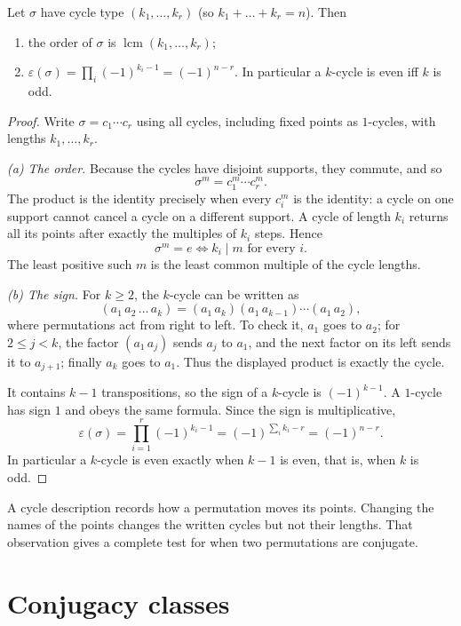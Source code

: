 \begin{corollary}\label{cor:ordersign}
Let $\sigma$ have cycle type $(k_1,\dots,k_r)$ (so $k_1+\dots+k_r=n$). Then
\begin{enumerate}[label=(\alph*)]
\item the order of $\sigma$ is $\operatorname{lcm}(k_1,\dots,k_r)$;
\item $\varepsilon(\sigma)=\prod_i(-1)^{k_i-1}=(-1)^{n-r}$. In particular a $k$-cycle is even iff $k$ is odd.
\end{enumerate}
\end{corollary}
\begin{proof}
Write $\sigma=c_1\cdots c_r$ using all cycles,
including fixed points as $1$-cycles, with
lengths $k_1,\ldots,k_r$.

\emph{(a) The order.}
Because the cycles have disjoint supports, they commute,
and so
\[
\sigma^m=c_1^m\cdots c_r^m.
\]
The product is the identity precisely when every
$c_i^m$ is the identity: a cycle on one support cannot
cancel a cycle on a different support.
A cycle of length $k_i$ returns all its points after
exactly the multiples of $k_i$ steps. Hence
\[
\sigma^m=e
\iff k_i\mid m\text{ for every }i.
\]
The least positive such $m$ is the least common multiple
of the cycle lengths.

\emph{(b) The sign.}
For $k\ge2$, the $k$-cycle can be written as
\[
(a_1\,a_2\,\ldots\,a_k)
=(a_1\,a_k)(a_1\,a_{k-1})\cdots(a_1\,a_2),
\]
where permutations act from right to left.
To check it, $a_1$ goes to $a_2$; for
$2\le j<k$, the factor $(a_1\,a_j)$ sends
$a_j$ to $a_1$, and the next factor on its left
sends it to $a_{j+1}$; finally $a_k$ goes to $a_1$.
Thus the displayed product is exactly the cycle.

It contains $k-1$ transpositions, so the sign
of a $k$-cycle is $(-1)^{k-1}$.
A $1$-cycle has sign $1$ and obeys the same formula.
Since the sign is multiplicative,
\[
\varepsilon(\sigma)
=\prod_{i=1}^r(-1)^{k_i-1}
=(-1)^{\sum_i k_i-r}
=\boxed{(-1)^{n-r}}.
\]
In particular a $k$-cycle is even exactly when
$k-1$ is even, that is, when $k$ is odd.
\end{proof}

A cycle description records how a permutation moves its points. Changing the names of the points changes the written cycles but not their lengths. That observation gives a complete test for when two permutations are conjugate.

\section{Conjugacy classes}

